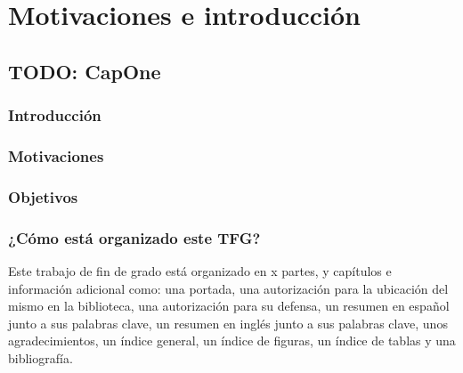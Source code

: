 \part{Motivaciones e introducción}
\chapter{TODO: CapOne}
\section{Introducción}

\section{Motivaciones}

\section{Objetivos}

\section{¿Cómo está organizado este TFG?}
Este trabajo de fin de grado está organizado en x partes, y capítulos e información adicional como: una portada, una autorización para la ubicación del mismo en la biblioteca, una autorización para su defensa, un resumen en español junto a sus palabras clave, un resumen en inglés junto a sus palabras clave, unos agradecimientos, un índice general, un índice de figuras, un índice de tablas y una bibliografía.

